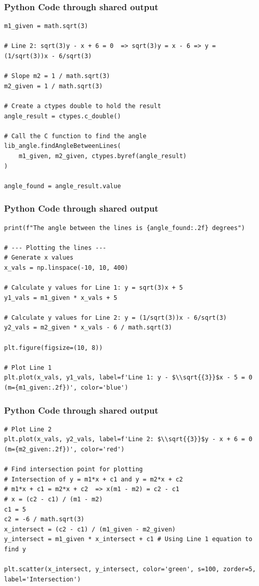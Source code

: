 \documentclass{beamer}
\begin{document}
\begin{frame}[fragile]
\frametitle{Python Code through shared output }

\begin{lstlisting}
m1_given = math.sqrt(3)

# Line 2: sqrt(3)y - x + 6 = 0  => sqrt(3)y = x - 6 => y = (1/sqrt(3))x - 6/sqrt(3)

# Slope m2 = 1 / math.sqrt(3)
m2_given = 1 / math.sqrt(3)

# Create a ctypes double to hold the result
angle_result = ctypes.c_double()

# Call the C function to find the angle
lib_angle.findAngleBetweenLines(
    m1_given, m2_given, ctypes.byref(angle_result)
)

angle_found = angle_result.value
\end{lstlisting}
\end{frame}

\begin{frame}[fragile]
\frametitle{Python Code through shared output }

\begin{lstlisting}
print(f"The angle between the lines is {angle_found:.2f} degrees")

# --- Plotting the lines ---
# Generate x values
x_vals = np.linspace(-10, 10, 400)

# Calculate y values for Line 1: y = sqrt(3)x + 5
y1_vals = m1_given * x_vals + 5

# Calculate y values for Line 2: y = (1/sqrt(3))x - 6/sqrt(3)
y2_vals = m2_given * x_vals - 6 / math.sqrt(3)

plt.figure(figsize=(10, 8))

# Plot Line 1
plt.plot(x_vals, y1_vals, label=f'Line 1: y - $\\sqrt{{3}}$x - 5 = 0 (m={m1_given:.2f})', color='blue')
\end{lstlisting}
\end{frame}

\begin{frame}[fragile]
\frametitle{Python Code through shared output }

\begin{lstlisting}
# Plot Line 2
plt.plot(x_vals, y2_vals, label=f'Line 2: $\\sqrt{{3}}$y - x + 6 = 0 (m={m2_given:.2f})', color='red')

# Find intersection point for plotting
# Intersection of y = m1*x + c1 and y = m2*x + c2
# m1*x + c1 = m2*x + c2  => x(m1 - m2) = c2 - c1
# x = (c2 - c1) / (m1 - m2)
c1 = 5
c2 = -6 / math.sqrt(3)
x_intersect = (c2 - c1) / (m1_given - m2_given)
y_intersect = m1_given * x_intersect + c1 # Using Line 1 equation to find y

plt.scatter(x_intersect, y_intersect, color='green', s=100, zorder=5, label='Intersection')
\end{lstlisting}
\end{frame}
\end{document}
